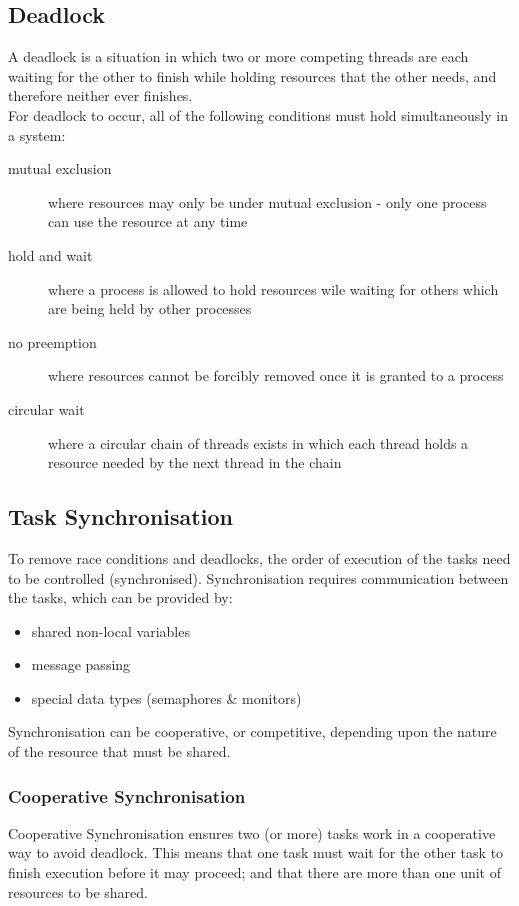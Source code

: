 \subsection{Deadlock}
A deadlock is a situation in which two or more competing threads are each waiting for the other to finish while holding resources that the other needs, and therefore neither ever finishes. \\

For deadlock to occur, all of the following conditions must hold simultaneously in a system:
\begin{description}
    \item[mutual exclusion] where resources may only be under mutual exclusion - only one process can use the resource at any time
    \item[hold and wait] where a process is allowed to hold resources wile waiting for others which are being held by other processes
    \item[no preemption] where resources cannot be forcibly removed once it is granted to a process
    \item[circular wait] where a circular chain of threads exists in which each thread holds a resource needed by the next thread in the chain 
\end{description}

\subsection{Task Synchronisation}
To remove race conditions and deadlocks, the order of execution of the tasks need to be controlled (synchronised). Synchronisation requires communication between the tasks, which can be provided by:
\begin{itemize}
    \item shared non-local variables
    \item message passing
    \item special data types (semaphores \& monitors)
\end{itemize}
Synchronisation can be cooperative, or competitive, depending upon the nature of the resource that must be shared.

\subsubsection{Cooperative Synchronisation}
Cooperative Synchronisation ensures two (or more) tasks work in a cooperative way to avoid deadlock. This means that one task must wait for the other task to finish execution before it may proceed; and that there are more than one unit of resources to be shared.\\

